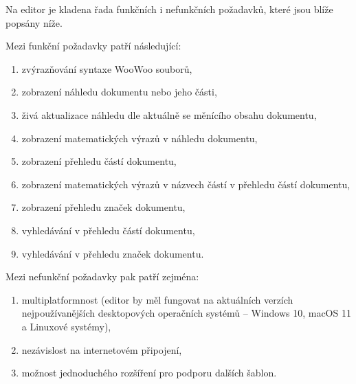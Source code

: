 Na editor je kladena řada funkčních i nefunkčních požadavků, které jsou blíže popsány níže.

Mezi funkční požadavky patří následující:

\begin{enumerate}[label=\textbf{F\arabic*}, ref=F\arabic*]
    \item zvýrazňování syntaxe WooWoo souborů,
    \item zobrazení náhledu dokumentu nebo jeho části,
    \item živá aktualizace náhledu dle aktuálně se měnícího obsahu dokumentu,
    \item zobrazení matematických výrazů v náhledu dokumentu,
    \item zobrazení přehledu částí dokumentu,
    \item zobrazení matematických výrazů v názvech částí v přehledu částí dokumentu,
    \item zobrazení přehledu značek dokumentu,
    \item vyhledávání v přehledu částí dokumentu,
    \item vyhledávání v přehledu značek dokumentu.
\end{enumerate}

Mezi nefunkční požadavky pak patří zejména:

\begin{enumerate}[label=\textbf{N\arabic*}, ref=N\arabic*]
    \item multiplatformnost (editor by měl fungovat na aktuálních verzích nejpoužívanějších desktopových operačních
        systémů – Windows 10, macOS 11 a Linuxové systémy),
    \item nezávislost na internetovém připojení,
    \item možnost jednoduchého rozšíření pro podporu dalších šablon.
\end{enumerate}
